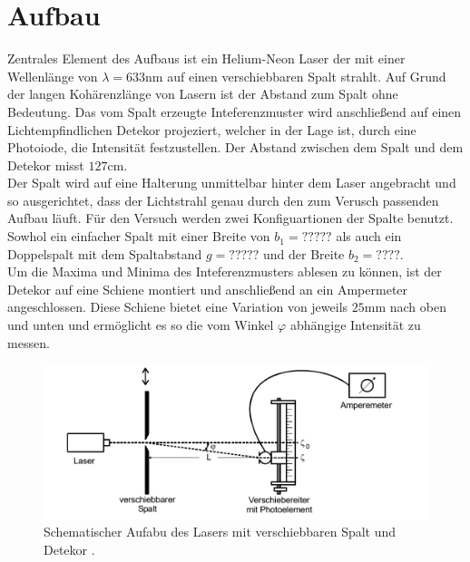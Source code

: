 \section{Aufbau}
Zentrales Element des Aufbaus ist ein Helium-Neon Laser der mit einer Wellenlänge von $\lambda = 633\si{\nano \meter}$ auf einen
verschiebbaren Spalt strahlt. Auf Grund der langen Kohärenzlänge von Lasern ist der Abstand zum Spalt ohne Bedeutung.
Das vom Spalt erzeugte Inteferenzmuster wird anschließend auf einen Lichtempfindlichen Detekor projeziert, 
welcher in der Lage ist, durch eine Photoiode, die Intensität festzustellen. Der Abstand zwischen dem Spalt und 
dem Detekor misst $127\si{\cm}$. 
\\
\newline
Der Spalt wird auf eine Halterung unmittelbar hinter dem Laser angebracht und so ausgerichtet, dass der Lichtstrahl 
genau durch den zum Verusch passenden Aufbau läuft. Für den Versuch werden zwei Konfiguartionen der Spalte benutzt. 
Sowhol ein einfacher Spalt mit einer Breite von $b_1=?????$ als auch ein Doppelspalt mit dem Spaltabstand $g=?????$ und der Breite $b_2=????$.
\\ 
\newline
Um die Maxima und Minima des Inteferenzmusters ablesen zu können, ist der Detekor auf eine Schiene montiert und anschließend an ein 
Ampermeter angeschlossen. 
Diese Schiene bietet eine Variation von jeweils $25 \si{\mm}$ nach oben und unten und ermöglicht es so die vom Winkel
$\varphi$ abhängige Intensität zu messen.
\begin{figure}
    \centering
    \includegraphics[width=\textwidth]{bilder/aufbau.png}
    \caption{Schematischer Aufabu des Lasers mit verschiebbaren Spalt und Detekor \cite{skript}.} 
    \label{fig:abb1}
\end{figure}
